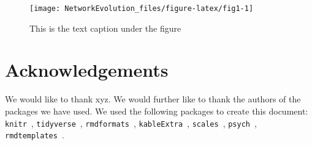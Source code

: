 \documentclass[runningheads]{llncs}
\begin{document}
\begin{figure}
\texttt{[image: NetworkEvolution\_files/figure-latex/fig1-1]} \caption{This is the text caption under the figure}\label{fig:fig1}
\end{figure}

\hypertarget{acknowledgements}{%
\section*{Acknowledgements}\label{acknowledgements}}

We would like to thank xyz. We would further like to thank the authors
of the packages we have used. We used the following packages to create
this document: \texttt{knitr}~\autocite{R-knitr},
\texttt{tidyverse}~\autocite{R-tidyverse},
\texttt{rmdformats}~\autocite{R-rmdformats},
\texttt{kableExtra}~\autocite{R-kableExtra},
\texttt{scales}~\autocite{R-scales}, \texttt{psych}~\autocite{R-psych},
\texttt{rmdtemplates}~\autocite{R-rmdtemplates}.


%
%
%
%
%
\printbibliography
\end{document}
